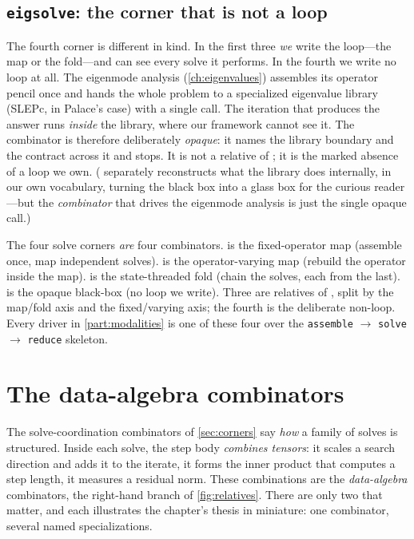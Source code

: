 \subsection{\texttt{eigsolve}: the corner that is not a loop}

The fourth corner is different in kind. In the first three \emph{we} write the
loop---the map or the fold---and can see every solve it performs. In the fourth we
write no loop at all. The eigenmode analysis (\cref{ch:eigenvalues}) assembles its
operator pencil once and hands the whole problem to a specialized eigenvalue
library (SLEPc, in Palace's case) with a single call. The iteration that produces
the answer runs \emph{inside} the library, where our framework cannot see it. The
combinator  is therefore deliberately \emph{opaque}: it names the
library boundary and the contract across it and stops. It is not a relative of
; it is the marked absence of a loop we own. (
separately reconstructs what the library does internally, in our own vocabulary,
turning the black box into a glass box for the curious reader---but the
\emph{combinator} that drives the eigenmode analysis is just the single opaque
call.)

\begin{keyidea}
The four solve corners \emph{are} four combinators.  is the
fixed-operator map (assemble once, map independent solves). 
is the operator-varying map (rebuild the operator inside the map).
 is the state-threaded fold (chain the solves, each from the
last).  is the opaque black-box (no loop we write). Three are
relatives of , split by the map/fold axis and the
fixed/varying axis; the fourth is the deliberate non-loop. Every driver in
\cref{part:modalities} is one of these four over the \texttt{assemble} $\to$
\texttt{solve} $\to$ \texttt{reduce} skeleton.
\end{keyidea}

\section{The data-algebra combinators}
\label{sec:dataalgebra}

The solve-coordination combinators of \cref{sec:corners} say \emph{how} a family of
solves is structured. Inside each solve, the step body \emph{combines tensors}:
it scales a search direction and adds it to the iterate, it forms the inner product
that computes a step length, it measures a residual norm. These combinations are
the \emph{data-algebra} combinators, the right-hand branch of \cref{fig:relatives}.
There are only two that matter, and each illustrates the chapter's thesis in
miniature: one combinator, several named specializations.

